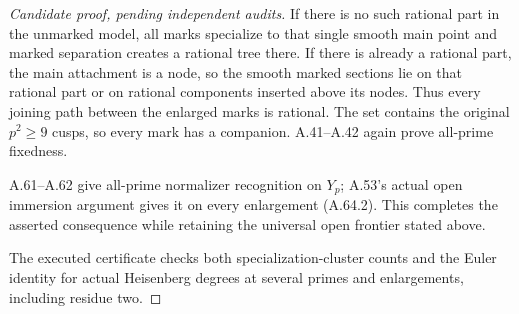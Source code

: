 \begin{proof}[Candidate proof, pending independent audits]
If there is no such rational part in the
unmarked model, all marks specialize to
that single smooth main point and marked
separation creates a rational tree there.
If there is already a rational part, the
main attachment is a node, so the smooth
marked sections lie on that rational part
or on rational components inserted above
its nodes. Thus every joining path between
the enlarged marks is rational. The set
contains the original \(p^2\ge9\) cusps,
so every mark has a companion. A.41--A.42
again prove all-prime fixedness.

A.61--A.62 give all-prime normalizer
recognition on \(Y_p\); A.53's actual open
immersion argument gives it on every
enlargement (A.64.2). This completes the
asserted consequence while retaining the
universal open frontier stated above.

The executed certificate
checks both specialization-cluster counts
and the Euler identity for actual
Heisenberg degrees at several primes and
enlargements, including residue two.
\end{proof}
